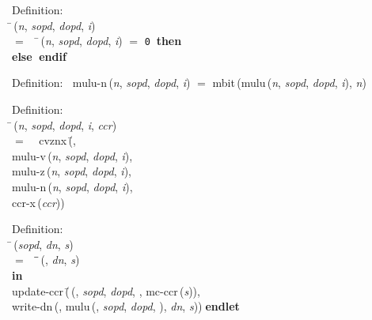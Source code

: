 \begin{tabbing}{\sc Definition}: \\  
\=\,({\it{n\/}}, {\it{sopd\/}}, {\it{dopd\/}}, {\it{i\/}}) \\ 
$=$$\;\;\;\;$\=\,({\it{n\/}}, {\it{sopd\/}}, {\it{dopd\/}}, {\it{i\/}}) $=$ {\tt{0}}$\;\;${\bf then }{} \\ 
{\bf else }{}$\;${\bf  endif}\-\-
\end{tabbing}

\begin{tabbing}{\sc Definition}:$\;\;$
{\rm{mulu-n}}\,({\it{n\/}}, {\it{sopd\/}}, {\it{dopd\/}}, {\it{i\/}}) $=$ {\rm{mbit}}\,({\rm{mulu}}\,({\it{n\/}}, {\it{sopd\/}}, {\it{dopd\/}}, {\it{i\/}}), {\it{n\/}})
\end{tabbing}

\begin{tabbing}{\sc Definition}: \\  
\=\,({\it{n\/}}, {\it{sopd\/}}, {\it{dopd\/}}, {\it{i\/}}, {\it{ccr\/}}) \\ 
$=$$\;\;\;\;${\rm{cvznx}}\,(\=, \\ 
{\rm{mulu-v}}\,({\it{n\/}}, {\it{sopd\/}}, {\it{dopd\/}}, {\it{i\/}}), \\ 
{\rm{mulu-z}}\,({\it{n\/}}, {\it{sopd\/}}, {\it{dopd\/}}, {\it{i\/}}), \\ 
{\rm{mulu-n}}\,({\it{n\/}}, {\it{sopd\/}}, {\it{dopd\/}}, {\it{i\/}}), \\ 
{\rm{ccr-x}}\,({\it{ccr\/}}))\-\-
\end{tabbing}

\begin{tabbing}{\sc Definition}: \\  
\=\,({\it{sopd\/}}, {\it{dn\/}}, {\it{s\/}}) \\ 
$=$$\;\;\;\;$\=\=\,({}, {\it{dn\/}}, {\it{s\/}})\- \\ 
{\bf in} \\ 
{\rm{update-ccr}}\,(\=\,({}, {\it{sopd\/}}, {\it{dopd\/}}, {}, {\rm{mc-ccr}}\,({\it{s\/}})), \\ 
{\rm{write-dn}}\,({}, {\rm{mulu}}\,({}, {\it{sopd\/}}, {\it{dopd\/}}, {}), {\it{dn\/}}, {\it{s\/}}))\-$\;${\bf  endlet}\-\-
\end{tabbing}

